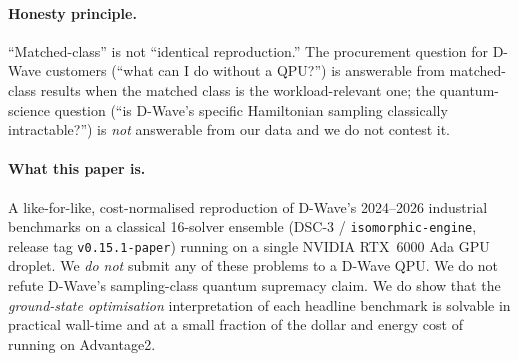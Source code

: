 \documentclass[11pt,a4paper]{article}
\begin{document}
\paragraph{Honesty principle.} ``Matched-class'' is not ``identical
reproduction.'' The procurement question for D-Wave customers (``what
can I do without a QPU?'') is answerable from matched-class results
when the matched class is the workload-relevant one; the
quantum-science question (``is D-Wave's specific Hamiltonian sampling
classically intractable?'') is \emph{not} answerable from our data and
we do not contest it.

\paragraph{What this paper is.}
A like-for-like, cost-normalised reproduction of D-Wave's 2024--2026 industrial
benchmarks on a classical 16-solver ensemble (DSC-3 /
\texttt{isomorphic-engine}, release tag \texttt{v0.15.1-paper}) running
on a single NVIDIA RTX~6000 Ada GPU droplet. We \emph{do not}
submit any of these problems to a D-Wave QPU. We do not refute D-Wave's
sampling-class quantum supremacy claim. We do show that the \emph{ground-state
optimisation} interpretation of each headline benchmark is solvable in
practical wall-time and at a small fraction of the dollar and energy cost of
running on Advantage2.
\end{document}

